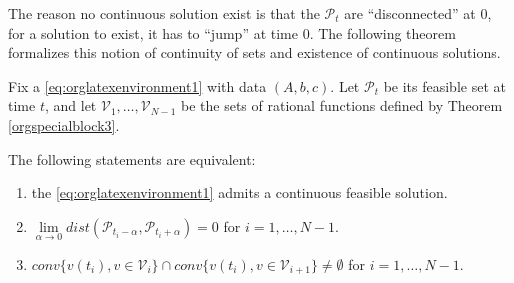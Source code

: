 \documentclass[moor]{informs1}
\begin{document}
The reason no continuous solution exist is that the \(\mathcal P_t\) are ``disconnected'' at 0, for a solution to exist, it has to ``jump'' at time 0. The following theorem formalizes this notion of continuity of sets and existence of continuous solutions.

\begin{thm}
Fix a \ref{eq:orglatexenvironment1} with data \((A, b, c)\). Let \(\mathcal P_t\) be its feasible set at time \(t\), and let  \(\mathcal V_1, \ldots, \mathcal V_{N-1}\) be the sets of rational functions defined by Theorem \ref{orgspecialblock3}.

The following statements are equivalent:
\begin{enumerate}
\item the \ref{eq:orglatexenvironment1} admits a continuous feasible solution.
\item \(\underset{\alpha \rightarrow 0}{\lim} dist(\mathcal P_{t_i-\alpha}, \mathcal P_{t_i+\alpha}) = 0\) for \(i = 1, \ldots, N-1\).
\item \(conv \{ v(t_{i}), v \in \mathcal V_i\} \cap conv \{ v(t_{i}), v \in \mathcal V_{i+1}\} \ne \emptyset\) for \(i = 1, \ldots, N-1\).
\end{enumerate}
\label{orgspecialblock4}

\end{thm}
\end{document}
